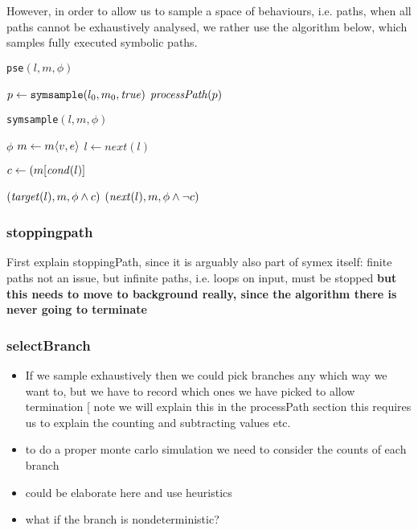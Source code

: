 However, in order to allow us to sample a space of behaviours, i.e. paths, when all paths cannot be exhaustively analysed, we rather use the algorithm below, which samples fully executed symbolic paths. 

\begin{minipage}{0.5\textwidth}
\begin{algorithm}[H]
\renewcommand{\thealgorithm}{}
\caption{{\tt pse}$(l,m,\phi)$}
\label{symexe}
\begin{algorithmic}
 \REPEAT
  \STATE $p \gets {\tt symsample}(l_0, m_0, \mathit{true})$
  \STATE $\mathit{processPath}(p)$
\end{algorithmic}
\end{algorithm}
\end{minipage}
\begin{minipage}{0.5\textwidth}
\begin{algorithm}[H]
\renewcommand{\thealgorithm}{}
\caption{{\tt symsample}$(l,m,\phi)$}
\label{symexe}
\begin{algorithmic}
 \RETURN $\phi$
 \ENDIF
   \STATE $m \gets m\langle v, e\rangle$
   \STATE $l \gets next(l)$
 \ENDWHILE
 
 \STATE $c \gets (m[\mathit{cond}(l)]$
 
   $(\mathit{target}(l), m, \phi \wedge c)$
 \ELSE
   $(\mathit{next}(l), m, \phi \wedge \neg c)$
 \ENDIF
\end{algorithmic}
\end{algorithm}
\end{minipage}

\subsubsection{stoppingpath}

First explain stoppingPath, since it is arguably also part of symex itself: finite paths not an issue, but infinite paths, i.e. loops on input, must be stopped  {\bf but this needs to move to background really, since the algorithm there is never going to terminate}

\subsubsection{selectBranch}

\begin{itemize}
\item If we sample exhaustively then we could pick branches any which way we want to, but we have to record which ones we have picked to allow termination [ note we will explain this in the processPath section this requires us to explain the counting and subtracting values etc.
\item to do a proper monte carlo simulation we need to consider the counts of each branch
\item could be elaborate here and use heuristics
\item what if the branch is nondeterministic?
\end{itemize}

